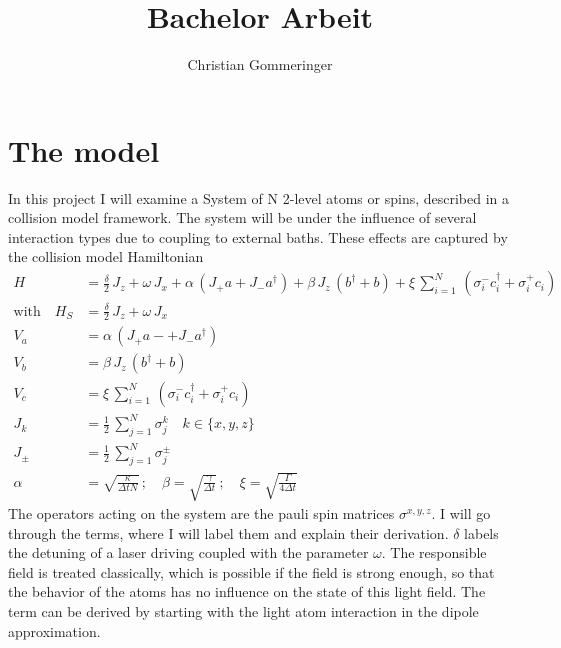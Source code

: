 \documentclass{article}
\title{Bachelor Arbeit}
\author{Christian Gommeringer}
\begin{document}
\newcommand{\half}{\frac{1}{2}}
\newcommand{\Tr}{\operatorname{Tr}}
\newcommand{\Trs}[1]{\Tr_S\left\{#1\right\}}
\newcommand{\Trb}[1]{\Tr_B\left\{#1\right\}}
\newcommand{\dt}{\frac{\text{d}}{\text{d}t}}
\newcommand{\tk}{\tilde{\kappa}}
\newcommand{\tw}{\tilde{\omega}}
\newcommand{\dkw}{\left(\frac{\text{d}}{\text{d}{y}}\,\frac{\Omega^2}{K}\right)}
\newcommand{\kw}{\frac{\Omega^2}{K}}
\newcommand{\ty}{{y}}
\newcommand{\diff}{\text{d}}
\maketitle


\section{The model}
In this project I will examine a System of N 2-level atoms or spins, described in a collision model framework\cite{ciccarello_cm,cm_source2}. The system will be under the influence of several interaction types due to coupling to external baths. These effects are captured by the collision model Hamiltonian 
\begin{align*}
    H &= \frac{\delta}{2}\,J_z+ \omega\,J_x+\alpha\,(J_+a + J_-a^\dagger)+ \beta\,J_z\,(b^\dagger+b)+\xi\,\sum_{i=1}^N\,(\sigma_i^-c_i^\dagger+\sigma_i^+c_i)\\
    \text{with}\quad H_S&=\frac{\delta}{2}\,J_z+ \omega\,J_x\\
    V_a&=\alpha\,(J_+a- + J_-a^\dagger)\\
    V_b&=\beta\,J_z\,(b^\dagger+b)\\
    V_c&=\xi\,\sum_{i=1}^N\,(\sigma_i^-c_i^\dagger+\sigma_i^+c_i)\\
    J_k &=\half\,\sum_{j=1}^N\sigma_j^k\quad k\in\{x,y,z\}\\
    J_\pm&=\half\,\sum_{j=1}^N\sigma_j^\pm\\
    \alpha&=\sqrt{\frac{\kappa}{\Delta tN}}\,;\quad \beta=\sqrt{\frac{\gamma}{\Delta t}}\,;\quad \xi=\sqrt{\frac{\Gamma}{4\Delta t}}
\end{align*}
The operators acting on the system are the pauli spin matrices $\sigma^{x,y,z}$. I will go through the terms, where I will label them and explain their derivation. $\delta$ labels the detuning of a laser driving coupled with the parameter $\omega$. The responsible field is treated classically, which is possible if the field is strong enough, so that the behavior of the atoms has no influence on the state of this light field. The term can be derived by starting with the light atom interaction in the dipole approximation.
\end{document}
